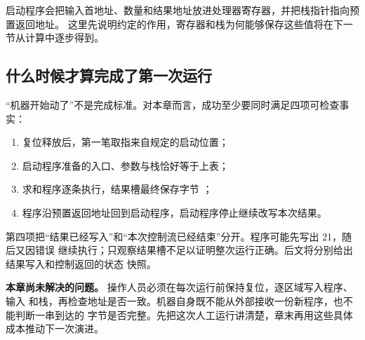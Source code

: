 启动程序会把输入首地址、数量和结果地址放进处理器寄存器，并把栈指针指向预置返回地址。
这里先说明约定的作用，寄存器和栈为何能够保存这些值将在下一节从计算中逐步得到。

\subsection{什么时候才算完成了第一次运行}

“机器开始动了”不是完成标准。对本章而言，成功至少要同时满足四项可检查事实：

\begin{enumerate}
\item 复位释放后，第一笔取指来自规定的启动位置；
\item 启动程序准备的入口、参数与栈恰好等于上表；
\item 求和程序逐条执行，结果槽最终保存字节 ；
\item 程序沿预置返回地址回到启动程序，启动程序停止继续改写本次结果。
\end{enumerate}

第四项把“结果已经写入”和“本次控制流已经结束”分开。程序可能先写出 21，随后又因错误
继续执行；只观察结果槽不足以证明整次运行正确。后文将分别给出结果写入和控制返回的状态
快照。

\begin{problemframe}
\textbf{本章尚未解决的问题。} 操作人员必须在每次运行前保持复位，逐区域写入程序、输入
和栈，再检查地址是否一致。机器自身既不能从外部接收一份新程序，也不能判断一串到达的
字节是否完整。先把这次人工运行讲清楚，章末再用这些具体成本推动下一次演进。
\end{problemframe}
